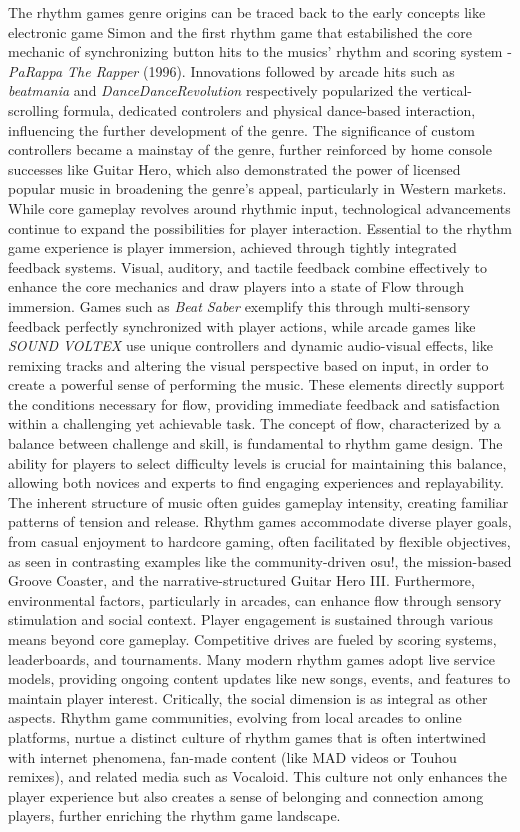 The rhythm games genre origins can be traced back to the early concepts like electronic game Simon and the first rhythm game that estabilished the core mechanic of synchronizing button hits to the musics' rhythm and scoring system - \textit{PaRappa The Rapper} (1996). Innovations followed by arcade hits such as \textit{beatmania} and \textit{DanceDanceRevolution} respectively popularized the vertical-scrolling formula, dedicated controlers and physical dance-based interaction, influencing the further development of the genre. The significance of custom controllers became a mainstay of the genre, further reinforced by home console successes like Guitar Hero, which also demonstrated the power of licensed popular music in broadening the genre's appeal, particularly in Western markets. While core gameplay revolves around rhythmic input, technological advancements continue to expand the possibilities for player interaction.
Essential to the rhythm game experience is player immersion, achieved through tightly integrated feedback systems. Visual, auditory, and tactile feedback combine effectively to enhance the core mechanics and draw players into a state of Flow through immersion. Games such as \textit{Beat Saber} exemplify this through multi-sensory feedback perfectly synchronized with player actions, while arcade games like \textit{SOUND VOLTEX} use unique controllers and dynamic audio-visual effects, like remixing tracks and altering the visual perspective based on input, in order to create a powerful sense of performing the music. These elements directly support the conditions necessary for flow, providing immediate feedback and satisfaction within a challenging yet achievable task.
The concept of flow, characterized by a balance between challenge and skill, is fundamental to rhythm game design. The ability for players to select difficulty levels is crucial for maintaining this balance, allowing both novices and experts to find engaging experiences and replayability. The inherent structure of music often guides gameplay intensity, creating familiar patterns of tension and release. Rhythm games accommodate diverse player goals, from casual enjoyment to hardcore gaming, often facilitated by flexible objectives, as seen in contrasting examples like the community-driven osu!, the mission-based Groove Coaster, and the narrative-structured Guitar Hero III. Furthermore, environmental factors, particularly in arcades, can enhance flow through sensory stimulation and social context.
Player engagement is sustained through various means beyond core gameplay. Competitive drives are fueled by scoring systems, leaderboards, and tournaments. Many modern rhythm games adopt live service models, providing ongoing content updates like new songs, events, and features to maintain player interest. Critically, the social dimension is as integral as other aspects. Rhythm game communities, evolving from local arcades to online platforms, nurtue a distinct culture of rhythm games that is often intertwined with internet phenomena, fan-made content (like MAD videos or Touhou remixes), and related media such as Vocaloid. This culture not only enhances the player experience but also creates a sense of belonging and connection among players, further enriching the rhythm game landscape.
